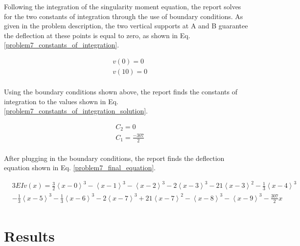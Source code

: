 \documentclass[a4paper]{article}
\begin{document}
Following the integration of the singularity moment equation, the report solves for the two constants of integration through the use of boundary conditions. As given in the problem description, the two vertical supports at A and B guarantee the deflection at these points is equal to zero, as shown in Eq. \ref{problem7_constants_of_integration}.

\begin{equation}
\begin{split}
	& v(0) = 0 \\
	& v(10) = 0 \\
\end{split}
\label{problem7_constants_of_integration}
\end{equation}

Using the boundary conditions shown above, the report finds the constants of integration to the values shown in Eq. \ref{problem7_constants_of_integration_solution}.

\begin{equation}
\begin{split}
	& C_2 = 0 \\
	& C_1 = \frac{-307}{2} \\
\end{split}
\label{problem7_constants_of_integration_solution}
\end{equation}

After plugging in the boundary conditions, the report finds the deflection equation shown in Eq. \ref{problem7_final_equation}.

\begin{equation}
\begin{split}
  & 3EI v(x) = \frac{3}{2}\left<x-0\right>^3 - \left<x-1\right>^3 - \left<x-2\right>^3 - 2\left<x-3\right>^3 - 21\left<x-3\right>^2 - \frac{1}{3}\left<x-4\right>^3 \\
& - \frac{1}{3}\left<x-5\right>^3 - \frac{1}{3}\left<x-6\right>^3 - 2\left<x-7\right>^3 + 21\left<x-7\right>^2 - \left<x-8\right>^3 - \left<x-9\right>^3 -   \frac{307}{2}x\\
\end{split}
\label{problem7_final_equation}
\end{equation}

\section{Results}\label{Results}
\end{document}

